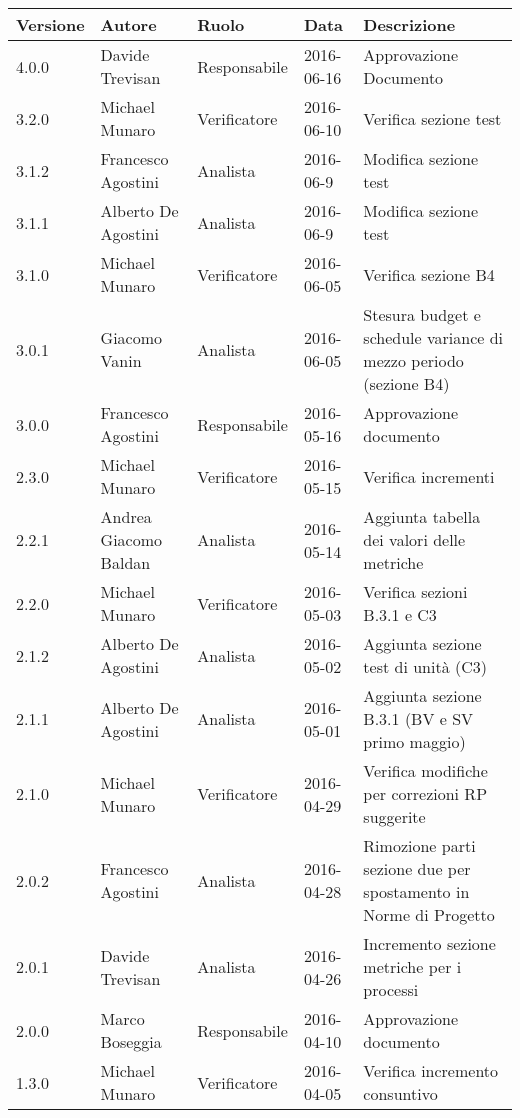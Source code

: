 \documentclass{scalatekids-article}
\begin{document}
\begin{center}
  \begin{longtable}{| l | l | l | l | p{5cm} |}
    \hline
    Versione & Autore & Ruolo & Data & Descrizione \\
    \hline
    4.0.0 & Davide Trevisan & Responsabile & 2016-06-16 & Approvazione Documento\\
    \hline
    3.2.0 & Michael Munaro & Verificatore & 2016-06-10 & Verifica sezione test\\
    \hline
    3.1.2 & Francesco Agostini & Analista & 2016-06-9 & Modifica sezione test\\
    \hline
    3.1.1 & Alberto De Agostini & Analista & 2016-06-9 & Modifica sezione test\\
    \hline
    3.1.0 & Michael Munaro & Verificatore & 2016-06-05 & Verifica sezione B4\\
    \hline
    3.0.1 & Giacomo Vanin & Analista & 2016-06-05 & Stesura budget e schedule variance di mezzo periodo (sezione B4)\\
    \hline
    3.0.0 & Francesco Agostini & Responsabile & 2016-05-16 & Approvazione documento\\
    \hline
    2.3.0 & Michael Munaro & Verificatore & 2016-05-15 & Verifica incrementi\\
    \hline
    2.2.1 & Andrea Giacomo Baldan & Analista & 2016-05-14 & Aggiunta tabella dei valori delle metriche\\
    \hline
    2.2.0 & Michael Munaro & Verificatore & 2016-05-03 & Verifica sezioni B.3.1 e C3\\
    \hline
    2.1.2 & Alberto De Agostini & Analista & 2016-05-02 & Aggiunta sezione test di unità (C3)\\
    \hline
    2.1.1 & Alberto De Agostini & Analista & 2016-05-01 & Aggiunta sezione B.3.1 (BV e SV primo maggio) \\
    \hline
    2.1.0 & Michael Munaro & Verificatore & 2016-04-29 & Verifica modifiche per correzioni RP suggerite \\
    \hline
    2.0.2 & Francesco Agostini & Analista & 2016-04-28 & Rimozione parti sezione due per spostamento in Norme di Progetto\\
    \hline
    2.0.1 & Davide Trevisan & Analista & 2016-04-26 & Incremento sezione metriche per i processi \\
    \hline
    2.0.0 & Marco Boseggia & Responsabile & 2016-04-10 & Approvazione documento\\
    \hline
    1.3.0 & Michael Munaro & Verificatore & 2016-04-05 & Verifica incremento consuntivo\\

\end{longtable}
\end{center}
\end{document}
